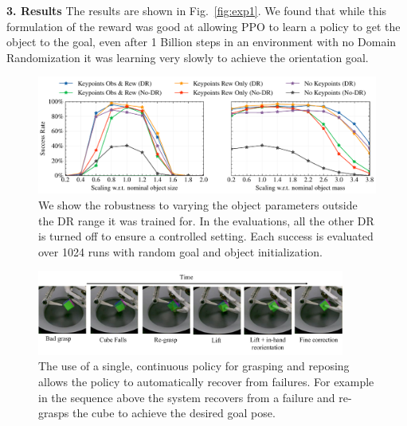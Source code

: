 \documentclass[letterpaper, 10 pt, conference]{ieeeconf}  %
\newcommand{\figref}[1]{Fig.~\ref{#1}}
\begin{document}
\noindent \textbf{3. Results} The results are shown in \figref{fig:exp1}. We found that while this formulation of the reward was good at allowing PPO to learn a policy to get the object to the goal, even after 1 Billion steps in an environment with no Domain Randomization it was learning very slowly to achieve the orientation goal.

\begin{figure}[t]
\begin{minipage}[c]{0.78\textwidth}
  \centering
  \includegraphics[width=\linewidth]{figure/dr_object_rebuttal.pdf}
\end{minipage}
\begin{minipage}[c]{0.21\textwidth}
\centering
\caption{We show the robustness to varying the object parameters outside the DR range it was trained for. In the evaluations, all the other DR is turned off to ensure a controlled setting. Each success is evaluated over 1024 runs with random goal and object initialization.}
\label{fig:dr_experiments_obj}
  \end{minipage}
\end{figure}

\begin{figure}[ht]
  \centering
  \includegraphics[width=0.9\textwidth]{figure/misc/closed_loop.pdf}
  \caption{The use of a single, continuous policy for grasping and reposing allows the policy to automatically recover from failures. For example in the sequence above the system recovers from a failure and re-grasps the cube to achieve the desired goal pose.}
  \label{fig:qualitative-rollout}
\end{figure}
\end{document}
